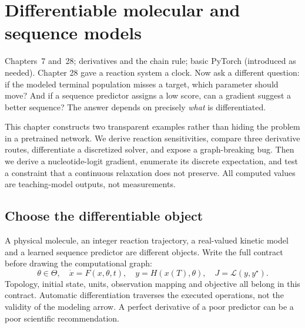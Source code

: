 \chapter{Differentiable molecular and sequence models}
{Chapters~7 and~28; derivatives and the chain rule; basic PyTorch (introduced as needed).}
Chapter 28 gave a reaction system a clock. Now ask a different question:
if the modeled terminal population misses a target, which parameter should move?
And if a sequence predictor assigns a low score, can a gradient suggest a better
sequence? The answer depends on precisely \emph{what} is differentiated.

This chapter constructs two transparent examples rather than hiding the problem in
a pretrained network. We derive reaction sensitivities, compare three derivative
routes, differentiate a discretized solver, and expose a graph-breaking bug.
Then we derive a nucleotide-logit gradient, enumerate its discrete expectation,
and test a constraint that a continuous relaxation does not preserve.
All computed values are teaching-model outputs, not measurements.

\section{Choose the differentiable object}
A physical molecule, an integer reaction trajectory, a real-valued kinetic model
and a learned sequence predictor are different objects. Write the full contract
before drawing the computational graph:
\[
  \theta\in\Theta,\quad \dot x=F(x,\theta,t),\quad
  y=H(x(T),\theta),\quad J=\mathcal L(y,y^\star).
\]
Topology, initial state, units, observation mapping and objective all belong in
this contract. Automatic differentiation traverses the executed operations, not
the validity of the modeling arrow. A perfect derivative of a poor predictor
can be a poor scientific recommendation.

